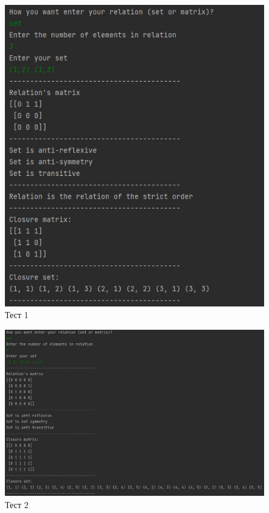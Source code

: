 \documentclass[spec, och, labwork]{shiza}
\begin{document}
        \begin{figure}[H]
            \centering      %
            \includegraphics[width=1.\textwidth]{1}
            \caption{Тест 1}
            \label{fig:image1}
        \end{figure}
        
        \begin{figure}[H]
            \centering      %
            \includegraphics[width=1.\textwidth]{2}
            \caption{Тест 2}
            \label{fig:image1}
        \end{figure}
\end{document}
